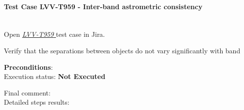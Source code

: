 \documentclass[DM,lsstdraft,STR,toc]{lsstdoc}
\begin{document}
\paragraph{Test Case LVV-T959 - Inter-band astrometric consistency
 }\mbox{}\\

Open  \href{https://jira.lsstcorp.org/secure/Tests.jspa#/testCase/LVV-T959}{\textit{ LVV-T959 } }
test case in Jira.

Verify that the separations between objects do not vary significantly
with band


\textbf{ Preconditions}:\\


Execution status: {\bf Not Executed }

Final comment:\\


Detailed steps results:
\end{document}
